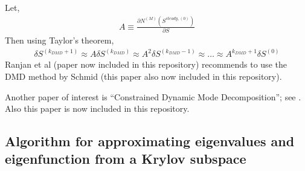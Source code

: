 \documentclass[]{article}
\begin{document}
Let,
\begin{eqnarray}
	A\equiv \frac{\partial N^{(M)}(S^{steady,(0)})}{\partial S}
\end{eqnarray}
Then using Taylor's theorem,
\begin{eqnarray}
	\delta S^{(k_{DMD}+1)}\approx 
	A \delta S^{(k_{DMD})}\approx
	A^{2} \delta S^{(k_{DMD}-1)}\approx\ldots\approx
	A^{k_{DMD}+1} \delta S^{(0)}
\end{eqnarray}
Ranjan et al\cite{RANJAN2020109076} (paper now included in this repository) 
recommends to 
use the DMD method by Schmid\cite{schmid2010dynamic} (this paper also
now included in this repository).

Another paper of interest is ``Constrained Dynamic Mode
Decomposition''; see \cite{9904965}.  Also this paper is now included in
this repository.

\subsection{Algorithm for approximating eigenvalues and eigenfunction from
  a Krylov subspace}
\end{document}
